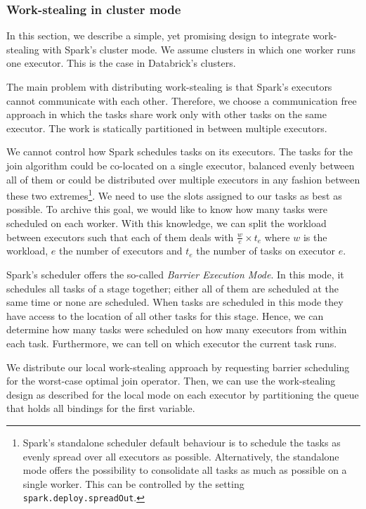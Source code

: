 \subsubsection{Work-stealing in cluster mode} \label{subsubsec:distributed-work-stealing}
In this section, we describe a simple, yet promising design to integrate work-stealing with Spark's cluster mode.
We assume clusters in which one worker runs one executor.
This is the case in Databrick's clusters.

The main problem with distributing work-stealing is that Spark's executors cannot communicate with each other.
Therefore, we choose a communication free approach in which the tasks share work only with other tasks on the same
executor.
The work is statically partitioned in between multiple executors.

We cannot control how Spark schedules tasks on its executors.
The tasks for the join algorithm could be co-located on a single executor, balanced evenly between all of them or could be distributed
over multiple executors in any fashion between these two extremes\footnote{Spark's standalone scheduler default behaviour is to schedule
the tasks as evenly spread over all executors as possible.
Alternatively, the standalone mode offers the possibility to consolidate all tasks as much as possible on a single worker.
This can be controlled by the setting \texttt{spark.deploy.spreadOut}.}.
We need to use the slots assigned to our tasks as best as possible.
To archive this goal, we would like to know how many tasks were scheduled on each worker.
With this knowledge, we can split the workload between executors such that each of them deals with $\frac{w}{e} \times t_e$
where $w$ is the workload, $e$ the number of executors and $t_e$ the number of tasks on executor $e$.

Spark's scheduler offers the so-called \textit{Barrier Execution Mode}.
In this mode, it schedules all tasks of a stage together; either all of them are scheduled at the same time or
none are scheduled.
When tasks are scheduled in this mode they have access to the location of all other tasks for this stage.
Hence, we can determine how many tasks were scheduled on how many executors from within each task.
Furthermore, we can tell on which executor the current task runs.

We distribute our local work-stealing approach by requesting barrier scheduling for the worst-case optimal join
operator.
Then, we can use the work-stealing design as described for the local mode on each executor by partitioning the
queue that holds all bindings for the first variable.

